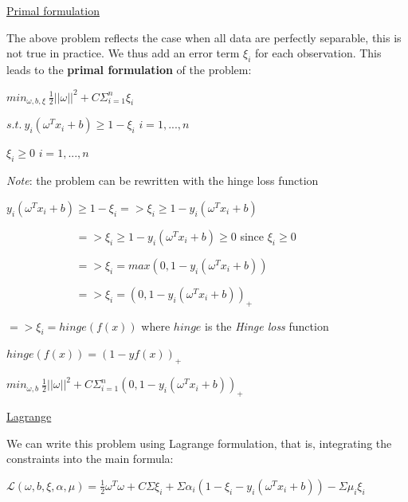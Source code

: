 \vspace{5mm}

\underline{Primal formulation}

\vspace{5mm}

The above problem reflects the case when all data are perfectly separable, this is not true in practice. We thus add an error term $\xi_i$ for each observation. This leads to the \textbf{primal formulation} of the problem:

\begin{center}
$min_{\omega,b, \xi}~\frac{1}{2}||\omega||^2+C\Sigma_{i=1}^{n}\xi_i$

$s.t.~y_i(\omega^Tx_i+b) \geq 1 - \xi_i$ $i=1,...,n$

$\xi_i \geq 0$ $i=1,...,n$
\end{center}

\vspace{5mm}

\textit{Note}: the problem can be rewritten with the hinge loss function

$y_i(\omega^Tx_i+b) \geq 1 - \xi_i => \xi_i \geq 1 - y_i(\omega^Tx_i+b)$

$~~~~~~~~~~~~~~~~~~~~~~~~~~~~ => \xi_i \geq 1 - y_i(\omega^Tx_i+b) \geq 0$ since $\xi_i \geq 0$

$~~~~~~~~~~~~~~~~~~~~~~~~~~~~ => \xi_i = max(0, 1 - y_i(\omega^Tx_i+b))$

$~~~~~~~~~~~~~~~~~~~~~~~~~~~~ => \xi_i = (0, 1 - y_i(\omega^Tx_i+b))_+$

$=> \xi_i = hinge(f(x))$ where $hinge$ is the \textit{Hinge loss} function 

$hinge(f(x)) = (1 - yf(x))_+$

\begin{center}
$min_{\omega,b}~\frac{1}{2}||\omega||^2+C\Sigma_{i=1}^{n} (0, 1 - y_i(\omega^Tx_i+b))_+$
\end{center}

\vspace{5mm}

\underline{Lagrange}

\vspace{5mm}

We can write this problem using Lagrange formulation, that is, integrating the constraints into the main formula:

$\mathcal{L}(\omega,b,\xi, \alpha, \mu) = \frac{1}{2}\omega^T\omega+C\Sigma \xi_i + \Sigma \alpha_i (1-\xi_i - y_i(\omega^Tx_i+b)) - \Sigma \mu_i \xi_i$

